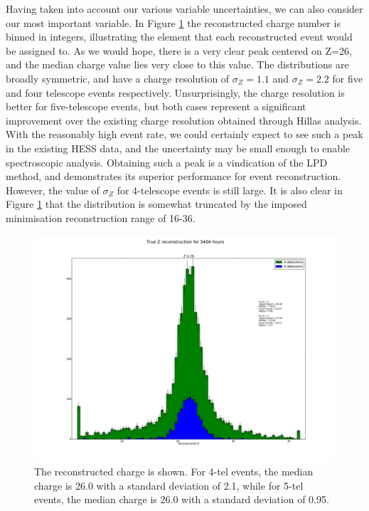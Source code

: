 \documentclass[11pt]{article}
\begin{document}
Having taken into account our various variable uncertainties, we can also consider our most important variable. In Figure \ref{fig:rawZ} the reconstructed charge number is binned in integers, illustrating the element that each reconstructed event would be assigned to. As we would hope, there is a very clear peak centered on Z=26, and the median charge value lies very close to this value. The distributions are broadly symmetric, and have a charge resolution of $\sigma_{Z} = 1.1$ and $\sigma_{Z} = 2.2$ for five and four telescope events respectively. Unsurprisingly, the charge resolution is better for five-telescope events, but both cases represent a significant improvement over the existing charge resolution obtained through Hillas analysis. With the reasonably high event rate, we could certainly expect to see such a peak in the existing HESS data, and the uncertainty may be small enough to enable spectroscopic analysis. Obtaining such a peak is a vindication of the LPD method, and demonstrates its superior performance for event reconstruction. However, the value of $\sigma_{Z}$ for 4-telescope events is still large. It is also clear in Figure \ref{fig:rawZ} that the distribution is somewhat truncated by the imposed minimisation reconstruction range of 16-36. 

\begin{figure}
\begin{center}
\includegraphics[width=\textwidth]{rawZ}
\caption{The reconstructed charge is shown. For 4-tel events, the median charge is 26.0 with a standard deviation of 2.1, while for 5-tel events, the median charge is 26.0 with a standard deviation of 0.95.}
\label{fig:rawZ}
\end{center}
\end{figure} 
\end{document}

